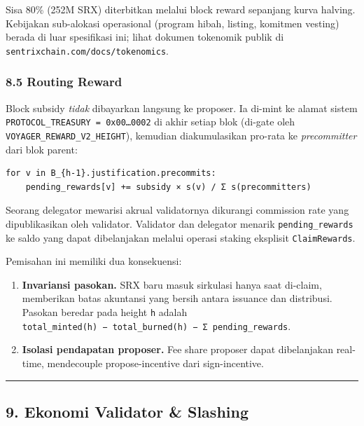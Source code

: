 \documentclass[11pt,a4paper]{article}
\providecommand{\tightlist}{\setlength{\itemsep}{0pt}\setlength{\parskip}{0pt}}
\begin{document}
Sisa 80\% (252M SRX) diterbitkan melalui block reward sepanjang kurva halving. Kebijakan sub-alokasi operasional (program hibah, listing, komitmen vesting) berada di luar spesifikasi ini; lihat dokumen tokenomik publik di \texttt{sentrixchain.com/docs/tokenomics}.

\hypertarget{routing-reward}{%
\subsubsection{8.5 Routing Reward}\label{routing-reward}}

Block subsidy \emph{tidak} dibayarkan langsung ke proposer. Ia di-mint ke alamat sistem \texttt{PROTOCOL\_TREASURY\ =\ 0x00…0002} di akhir setiap blok (di-gate oleh \texttt{VOYAGER\_REWARD\_V2\_HEIGHT}), kemudian diakumulasikan pro-rata ke \emph{precommitter} dari blok parent:

\begin{verbatim}
for v in B_{h-1}.justification.precommits:
    pending_rewards[v] += subsidy × s(v) / Σ s(precommitters)
\end{verbatim}

Seorang delegator mewarisi akrual validatornya dikurangi commission rate yang dipublikasikan oleh validator. Validator dan delegator menarik \texttt{pending\_rewards} ke saldo yang dapat dibelanjakan melalui operasi staking eksplisit \texttt{ClaimRewards}.

Pemisahan ini memiliki dua konsekuensi:

\begin{enumerate}
\def\labelenumi{\arabic{enumi}.}
\tightlist
\item
  \textbf{Invariansi pasokan.} SRX baru masuk sirkulasi hanya saat di-claim, memberikan batas akuntansi yang bersih antara issuance dan distribusi. Pasokan beredar pada height \texttt{h} adalah \texttt{total\_minted(h)\ −\ total\_burned(h)\ −\ Σ\ pending\_rewards}.
\item
  \textbf{Isolasi pendapatan proposer.} Fee share proposer dapat dibelanjakan real-time, mendecouple propose-incentive dari sign-incentive.
\end{enumerate}

\begin{center}\rule{0.5\linewidth}{0.5pt}\end{center}

\hypertarget{ekonomi-validator-slashing}{%
\subsection{9. Ekonomi Validator \& Slashing}\label{ekonomi-validator-slashing}}
\end{document}
